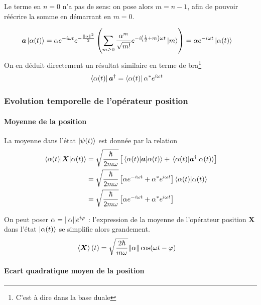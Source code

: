 \documentclass[11pt,oneside,a4paper]{article}
\newcommand{\h}{\ensuremath{\hbar}}
\begin{document}
Le terme en $n = 0$ n'a pas de sens: on pose alors $m=n-1$, afin de pouvoir réécrire la somme en démarrant en $m = 0$.

\begin{align}
  \bm{a}\ket{\alpha(t)} &= \alpha e^{-i\omega t}e^{-\frac{\norm{\alpha}^2}{2}}\left(\sum_{m\geq 0}\frac{\alpha^{m}}{\sqrt{m!}}e^{-i\left(\frac{1}{2}+m\right)\omega t}\ket{m}\right) = \alpha e^{-i\omega t}\ket{\alpha(t)}\label{eq:a alpha}
\end{align}
On en déduit directement un résultat similaire en terme de bra\footnote{C'est à dire dans la base duale}
\begin{align}
  \bra{\alpha(t)}\bm{a}^\dagger &= \bra{\alpha(t)}\alpha^*e^{i\omega t}\label{eq:alpha a dagger}
\end{align}

\subsubsection{Evolution temporelle de l'opérateur position}
\label{Evolution temporelle de l'opérateur position}

\paragraph{Moyenne de la position}

La moyenne dans l'état $\ket{\psi(t)}$ est donnée par la relation
\begin{align*}
  \expval{\bm{X}}{{\alpha(t)}} &= \sqrt{\frac{\h}{2m\omega}}\left[\expval{\bm{a}}{\alpha(t)}+\expval{\bm{a}^\dagger}{\alpha(t)}\right]\\
  &= \sqrt{\frac{\h}{2m\omega}} \left[\alpha e^{-i\omega t}+\alpha^*e^{i\omega t}\right]\braket{\alpha(t)}\\
  &= \sqrt{\frac{\h}{2m\omega}} \left[\alpha e^{-i\omega t}+\alpha^*e^{i\omega t}\right]
\end{align*}

On peut poser $\alpha = \norm{\alpha}e^{i\varphi}$ : l'expression de la moyenne de l'opérateur position $\bm{X}$ dans l'état $\ket{\alpha(t)}$ se simplifie alors grandement.
\begin{align}
  \label{mean position}
  \expval{\bm{X}}(t)&= \sqrt{\frac{2\h}{m\omega}}\norm{\alpha}\cos(\omega t-\varphi)
\end{align}

\paragraph{Ecart quadratique moyen de la position}
\end{document}
